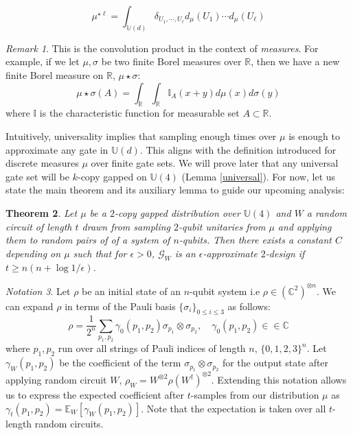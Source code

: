 \documentclass[12pt]{amsart}
\newtheorem{theorem}{Theorem}[section]
\theoremstyle{definition}
\theoremstyle{remark}
\newtheorem{remark}[theorem]{Remark}
\numberwithin{equation}{section}
\theoremstyle{remark}
\newtheorem{notation}[theorem]{Notation}
\begin{document}
%
\begin{equation}
\mu^{\star \ell} = \int_{\mathbb{U}(d)} \delta_{U_1,\cdots, U_\ell} d_\mu(U_1)\cdots d_\mu(U_\ell)
\end{equation}
%
\begin{remark}
  This is the convolution product in the context of \emph{measures}. For example, if we let $\mu,\sigma$ be two finite Borel measures over $\mathbb{R}$, then we have a new finite Borel measure on $\mathbb{R}$, $\mu \star \sigma$:
  $$ \mu \star \sigma(A) = \int_{\mathbb{R}}\int_{\mathbb{R}} \mathbb{I}_A(x+y) d\mu(x)d\sigma(y)$$
  where $\mathbb{I}$ is the characteristic function for measurable set $A \subset \mathbb{R}$.
\end{remark}
\noindent Intuitively, universality implies that sampling enough times over $\mu$ is enough to approximate any gate in $\mathbb{U}(d)$. This aligns with the definition introduced for discrete measures $\mu$ over finite gate sets. We will prove later that any universal gate set will be $k$-copy gapped on $\mathbb{U}(4)$ (Lemma \ref{universal}). For now, let us state the main theorem and its auxiliary lemma to guide our upcoming analysis:
%
\begin{theorem} \label{maintheorem}
  Let $\mu$ be a $2$-copy gapped distribution over $\mathbb{U}(4)$ and $W$ a random circuit of length $t$ drawn from sampling $2$-qubit unitaries from $\mu$ and applying them to random pairs of of a system of $n$-qubits. Then there exists a constant $C$ depending on $\mu$ such that for $\epsilon > 0$, $\mathcal{G}_W$ is an $\epsilon$-approximate $2$-design if $t \geq n(n + \log 1/\epsilon)$.
\end{theorem}
%
\begin{notation}
  Let $\rho$ be an initial state of an $n$-qubit system i.e $\rho \in (\mathbb{C}^{2})^{\otimes n}$. We can expand $\rho$ in terms of the Pauli basis $\{\sigma_i\}_{0 \leq i \leq 3}$ as follows:
  \begin{equation}
    \rho = \frac{1}{2^n} \sum_{p_1,p_2} \gamma_0(p_1,p_2) \sigma_{p_1} \otimes \sigma_{p_2}, \quad \gamma_0(p_1,p_2) \in \in \mathbb{C}
   \end{equation}
  where $p_1,p_2$ run over all strings of Pauli indices of length $n$, $\{0,1,2,3\}^n$. Let $\gamma_W(p_1,p_2)$ be the coefficient of the term $\sigma_{p_1} \otimes \sigma_{p_2}$ for the output state after applying random circuit $W$, $\rho_W = W^{\otimes 2} \rho (W^\dagger)^{\otimes 2}$. Extending this notation allows us to express the expected coefficient after $t$-samples from our distribution $\mu$ as
  $\gamma_t(p_1,p_2) = \mathbb{E}_W [\gamma_W(p_1,p_2)]$. Note that the expectation is taken over all $t$-length random circuits.
\end{notation}
\end{document}
